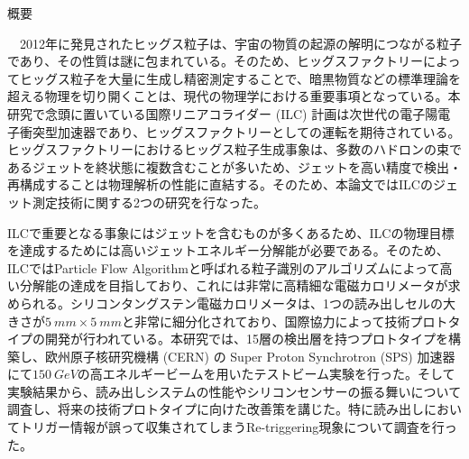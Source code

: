 
\ifabstract
 \maketitle
\fi
\begin{center}
{\LARGE 概要}\\
\end{center}
　2012年に発見されたヒッグス粒子は、宇宙の物質の起源の解明につながる粒子であり、その性質は謎に包まれている。そのため、ヒッグスファクトリーによってヒッグス粒子を大量に生成し精密測定することで、暗黒物質などの標準理論を超える物理を切り開くことは、現代の物理学における重要事項となっている。本研究で念頭に置いている国際リニアコライダー (ILC) 計画は次世代の電子陽電子衝突型加速器であり、ヒッグスファクトリーとしての運転を期待されている。ヒッグスファクトリーにおけるヒッグス粒子生成事象は、多数のハドロンの束であるジェットを終状態に複数含むことが多いため、ジェットを高い精度で検出・再構成することは物理解析の性能に直結する。そのため、本論文ではILCのジェット測定技術に関する2つの研究を行なった。

ILCで重要となる事象にはジェットを含むものが多くあるため、ILCの物理目標を達成するためには高いジェットエネルギー分解能が必要である。そのため、ILCではParticle Flow Algorithmと呼ばれる粒子識別のアルゴリズムによって高い分解能の達成を目指しており、これには非常に高精細な電磁カロリメータが求められる。シリコンタングステン電磁カロリメータは、1つの読み出しセルの大きさが$\SI{5}{mm} \times \SI{5}{mm}$と非常に細分化されており、国際協力によって技術プロトタイプの開発が行われている。本研究では、15層の検出層を持つプロトタイプを構築し、欧州原子核研究機構 (CERN) の Super Proton Synchrotron (SPS) 加速器にて$\SI{150}{GeV}$の高エネルギービームを用いたテストビーム実験を行った。そして実験結果から、読み出しシステムの性能やシリコンセンサーの振る舞いについて調査し、将来の技術プロトタイプに向けた改善策を講じた。特に読み出しにおいてトリガー情報が誤って収集されてしまうRe-triggering現象について調査を行った。

